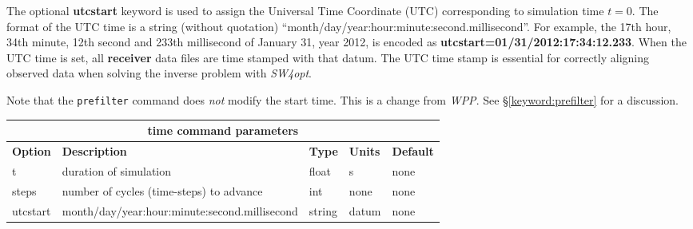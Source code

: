 \documentclass[11pt]{report}
\begin{document}
The optional {\bf utcstart} keyword is used to assign the Universal Time Coordinate (UTC)
corresponding to simulation time $t=0$. The format of the UTC time is a string (without quotation)
``month/day/year:hour:minute:second.millisecond''. For example, the 17th hour, 34th minute, 12th
second and 233th millisecond of January 31, year 2012, is encoded as {\bf
  utcstart=01/31/2012:17:34:12.233}. When the UTC time is set, all {\bf receiver} data files are
time stamped with that datum. The UTC time stamp is essential for correctly aligning
observed data when solving the inverse problem with \emph{SW4opt}.

Note that the \verb+prefilter+ command does {\it not} modify the start time. This is a change from
\emph{WPP}. See \S\ref{keyword:prefilter} for a discussion.
%
\begin{center}
\begin{tabular}{|l|p{8cm}|l|l|l|} \hline
\multicolumn{5}{|c|}{\bf time command parameters}\\ \hline
{\bf Option} & {\bf Description} & {\bf Type} & {\bf Units} & {\bf Default} \\ \hline \hline
t & duration of simulation & float & s	& none \\ \hline
steps & number of cycles (time-steps) to advance & int & none & none\\ \hline
utcstart & month/day/year:hour:minute:second.millisecond & string & datum & none\\ \hline
\end{tabular}
\end{center}

\end{document}
